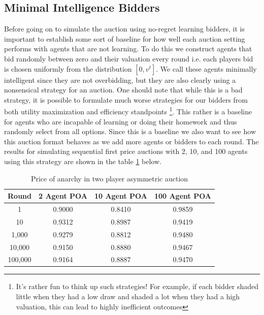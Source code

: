 \documentclass[12pt,twoside]{reedthesis}
\begin{document}
\subsection{Minimal Intelligence Bidders}
Before going on to simulate the auction using no-regret learning bidders, it is important to establish some sort of baseline for how well each auction setting performs with agents that are not learning. To do this we construct agents that bid randomly between zero and their valuation every round i.e. each players bid is chosen uniformly from the distribution $[0,v^t]$. We call these agents minimally intelligent since they are not overbidding, but they are also clearly using a nonsensical strategy for an auction. One should note that while this is a bad strategy, it is possible to formulate much worse strategies for our bidders from both utility maximization and efficiency standpoints \footnote{It's rather fun to think up such strategies! For example, if each bidder shaded little when they had a low draw and shaded a lot when they had a high valuation, this can lead to highly inefficient outcomes}. This rather is a baseline for agents who are incapable of learning or doing their homework and thus randomly select from all options. Since this is a baseline we also want to see how this auction format behaves as we add more agents or bidders to each round. The results for simulating sequential first price auctions with 2, 10, and 100 agents using this strategy are shown in the table \ref{table:zero_int_symmetric} below.

\begin{table}[h!]
	\begin{center}
		\begin{tabular}{ |c|c|c|c| }
			\hline
			Round & 2 Agent POA & 10 Agent POA & 100 Agent POA \\
			\hline
			1 & 0.9000 & 0.8410 & 0.9859\\
			10 & 0.9312 & 0.8987 & 0.9419\\
			1,000 & 0.9279 & 0.8812 & 0.9480\\
			10,000 & 0.9150 & 0.8880 & 0.9467\\
			100,000 & 0.9164 & 0.8887 & 0.9470\\
			\hline
		\end{tabular}
		\caption{Price of anarchy in two player asymmetric auction}
		\label{table:zero_int_symmetric}
	\end{center} 
\end{table}
\end{document}
